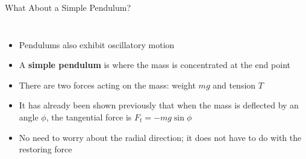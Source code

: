 \documentclass[12pt,compress,aspectratio=169]{beamer}
\begin{document}
\begin{frame}{What About a Simple Pendulum?}
  \begin{columns}
    \begin{itemize}
    \item Pendulums also exhibit oscillatory motion
    \item A \textbf{simple pendulum} is where the mass is concentrated at the
      end point 
    \item There are two forces acting on the mass: weight $mg$ and tension $T$
    \item It has already been shown previously that when the mass is deflected
      by an angle $\phi$, the tangential force is $F_t=-mg\sin\phi$
    \item No need to worry about the radial direction; it does not have to do
      with the restoring force
    \end{itemize}

    \centering 
  \end{columns}
\end{frame}
\end{document}
